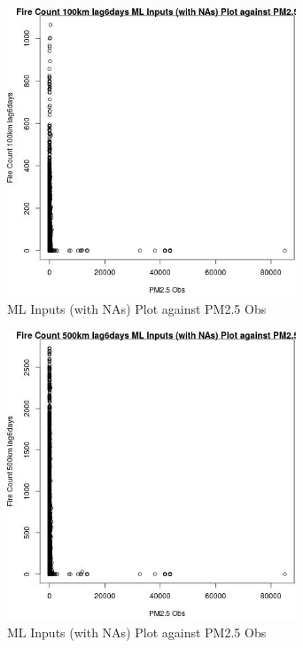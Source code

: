 \begin{figure} 
\centering  
\includegraphics[width=0.77\textwidth]{Code_Outputs/Report_ML_input_PM25_Step4_part_f_de_duplicated_aveswNAs_Fire_Count_100km_lag6daysvPM25_Obs.jpg} 
\caption{\label{fig:Report_ML_input_PM25_Step4_part_f_de_duplicated_aveswNAsFire_Count_100km_lag6daysvPM25_Obs}ML Inputs (with NAs) Plot against PM2.5 Obs} 
\end{figure} 
 

\begin{figure} 
\centering  
\includegraphics[width=0.77\textwidth]{Code_Outputs/Report_ML_input_PM25_Step4_part_f_de_duplicated_aveswNAs_Fire_Count_500km_lag6daysvPM25_Obs.jpg} 
\caption{\label{fig:Report_ML_input_PM25_Step4_part_f_de_duplicated_aveswNAsFire_Count_500km_lag6daysvPM25_Obs}ML Inputs (with NAs) Plot against PM2.5 Obs} 
\end{figure} 
 

